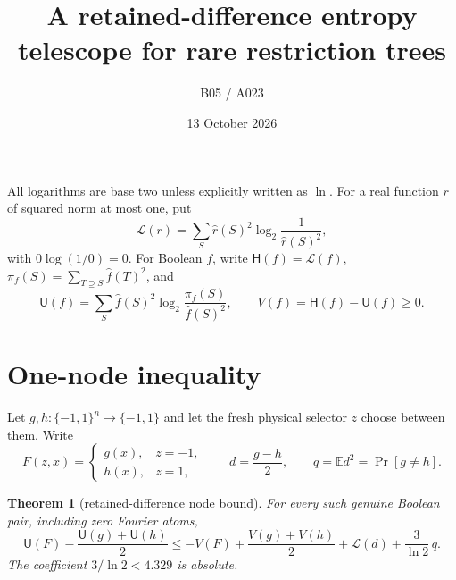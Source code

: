 \documentclass[11pt]{article}
\title{A retained-difference entropy telescope for rare restriction trees}
\author{B05 / A023}
\date{13 October 2026}
\newtheorem{theorem}{Theorem}
\newcommand{\E}{\mathbb E}
\newcommand{\cH}{\mathsf H}
\newcommand{\cU}{\mathsf U}
\begin{document}
\maketitle

All logarithms are base two unless explicitly written as $\ln$.  For a
real function $r$ of squared norm at most one, put
\[
  \mathcal L(r)=\sum_S \widehat r(S)^2
       \log_2\frac1{\widehat r(S)^2},
\]
with $0\log(1/0)=0$.  For Boolean $f$, write $\cH(f)=\mathcal L(f)$,
$\pi_f(S)=\sum_{T\supseteq S}\widehat f(T)^2$, and
\[
  \cU(f)=\sum_S\widehat f(S)^2
       \log_2\frac{\pi_f(S)}{\widehat f(S)^2},\qquad
  V(f)=\cH(f)-\cU(f)\geq0.
\]

\section{One-node inequality}

Let $g,h:\{-1,1\}^n\to\{-1,1\}$ and let the fresh physical selector
$z$ choose between them.  Write
\[
 F(z,x)=\begin{cases}g(x),&z=-1,\\h(x),&z=1,\end{cases}
 \qquad d=\frac{g-h}{2},\qquad q=\E d^2=\Pr[g\ne h].
\]

\begin{theorem}[retained-difference node bound]\label{thm:node}
For every such genuine Boolean pair, including zero Fourier atoms,
\[
 \cU(F)-\frac{\cU(g)+\cU(h)}2
 \leq -V(F)+\frac{V(g)+V(h)}2
       +\mathcal L(d)+\frac{3}{\ln2}\,q.                 \tag{1}
\]
The coefficient $3/\ln2<4.329$ is absolute.
\end{theorem}
\end{document}
